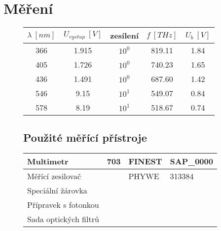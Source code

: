 \documentclass{article}
\begin{document}
\section{Měření}
\begin{figure}[H]
	\begin{minipage}[t]{0.5\textwidth}
        \begin{tabular}{|c|c|c|c|c|}
            \hline
            \(\lambda~[nm]\)    & \(U_{vystup}~[V]\)    & zesílení  & \(f~[THz]\)   & \(U_b~[V]\)   \\ \hline
            366                 & 1.915                 & \(10^0\)  & 819.11        & 1.84          \\ \hline
            405                 & 1.726                 & \(10^0\)  & 740.23        & 1.65          \\ \hline
            436                 & 1.491                 & \(10^0\)  & 687.60        & 1.42          \\ \hline
            546                 & 9.15                  & \(10^1\)  & 549.07        & 0.84          \\ \hline
            578                 & 8.19                  & \(10^1\)  & 518.67        & 0.74          \\ \hline
        \end{tabular}
	\end{minipage}
	\hfill
	\begin{minipage}[t]{0.5\textwidth}
        \footnotesize
        \vspace{-17mm}
        \subsection*{Použité měřící přístroje}
        \begin{tabular}{llll}
            Multimetr               & 703   & FINEST    & SAP\:001000282754\_0000 \\ \hline
            Měřící zesilovač        &       & PHYWE     & 313384                  \\ \hline
            Speciální žárovka       &       &           &                         \\ \hline
            Přípravek s fotonkou    &       &           &                         \\ \hline
            Sada optických filtrů   &       &           &                         \\ \hline    
        \end{tabular}
	\end{minipage}
\end{figure}
\end{document}
